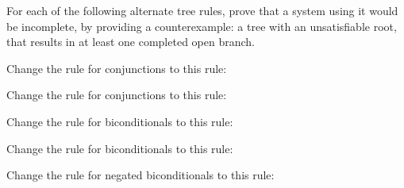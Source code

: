 \problempart
\label{pr.SL.completenessnesscounterexamples}
For each of the following alternate tree rules, prove that a system using it would be incomplete, by providing a counterexample: a tree with an unsatisfiable root, that results in at least one completed open branch.
\begin{earg}








\item Change the rule for conjunctions to this rule:

\item Change the rule for conjunctions to this rule:

\item Change the rule for biconditionals to this rule:

\item Change the rule for biconditionals to this rule:

\item Change the rule for negated biconditionals to this rule:


\end{earg}
